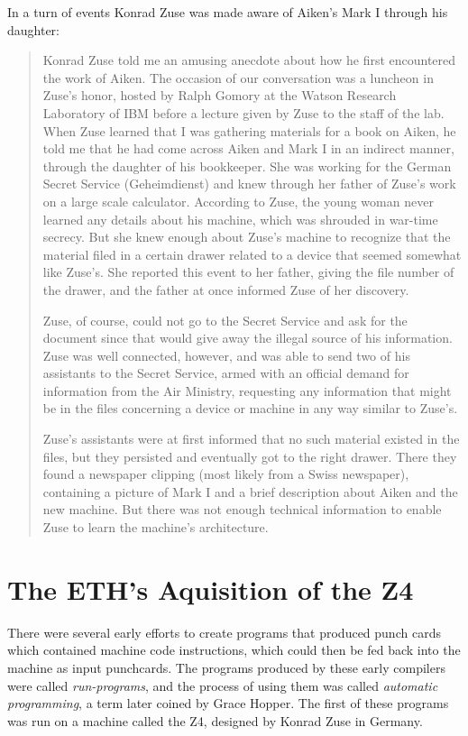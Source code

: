 In a turn of events Konrad Zuse was made aware of Aiken's Mark I through his daughter:
\begin{quotation}
Konrad Zuse told me an amusing anecdote about how he first encountered the work of Aiken. The occasion
of our conversation was a luncheon in Zuse's honor, hosted by Ralph Gomory at the Watson Research
Laboratory of IBM before a lecture given by Zuse to the staff of the lab. When Zuse learned that I was
gathering materials for a book on Aiken, he told me that he had come across Aiken and Mark I in an indirect
manner, through the daughter of his bookkeeper. She was working for the German Secret Service
(Geheimdienst) and knew through her father of Zuse's work on a large scale calculator. According to Zuse,
the young woman never learned any details about his machine, which was shrouded in war-time secrecy. But
she knew enough about Zuse's machine to recognize that the material filed in a certain drawer related to a
device that seemed somewhat like Zuse's. She reported this event to her father, giving the file number of the
drawer, and the father at once informed Zuse of her discovery.

Zuse, of course, could not go to the Secret Service and ask for the document since that would give away the
illegal source of his information. Zuse was well connected, however, and was able to send two of his
assistants to the Secret Service, armed with an official demand for information from the Air Ministry,
requesting any information that might be in the files concerning a device or machine in any way similar to
Zuse's.

Zuse's assistants were at first informed that no such material existed in the files, but they persisted and
eventually got to the right drawer. There they found a newspaper clipping (most likely from a Swiss
newspaper), containing a picture of Mark I and a brief description about Aiken and the new machine. But
there was not enough technical information to enable Zuse to learn the machine's architecture.
\cite{howard_aiken_and_the_dawn_of_the_computer_age_2000}
\end{quotation}

\section{The ETH's Aquisition of the Z4}

There were several early efforts to create programs that produced punch cards
which contained machine code instructions, which could then be fed back into the machine
as input punchcards.
The programs produced by these early compilers were called \textit{run-programs},
and the process of using them was called \textit{automatic programming}, a term later
coined by Grace Hopper.
The first of these programs was run on a machine called the Z4, designed by Konrad Zuse in Germany.

